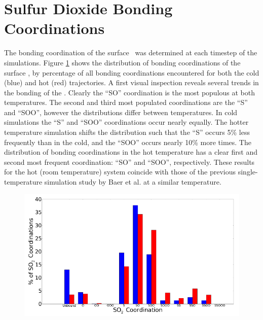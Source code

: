 \section {Sulfur Dioxide Bonding Coordinations}

The bonding coordination of the surface \suldiox~was determined at each timestep of the simulations. Figure \ref{fig:bonding-coordinations} shows the distribution of bonding coordinations of the surface \suldiox, by percentage of all bonding coordinations encountered for both the cold (blue) and hot (red) trajectories. A first visual inspection reveals several trends in the bonding of the \suldiox. Clearly the ``SO'' coordination is the most populous at both temperatures. The second and third most populated coordinations are the ``S'' and ``SOO'', however the distributions differ between temperatures. In cold simulations the ``S'' and ``SOO'' coordinations occur nearly equally. The hotter temperature simulation shifts the distribution such that the ``S'' occurs 5\% less frequently than in the cold, and the ``SOO'' occurs nearly 10\% more times. The distribution of bonding coordinations in the hot temperature has a clear first and second most frequent coordination: ``SO'' and ``SOO'', respectively. These results for the hot (room temperature) system coincide with those of the previous single-temperature simulation study by Baer et al. at a similar temperature.\cite{Baer2010}

\begin{figure}[h!]
	\begin{center}
		\includegraphics[scale=1.0]{images/coordinations/so2-coordinations-percents-small.png}
		\caption{}
		\label{fig:bonding-coordinations}
	\end{center}
\end{figure}

